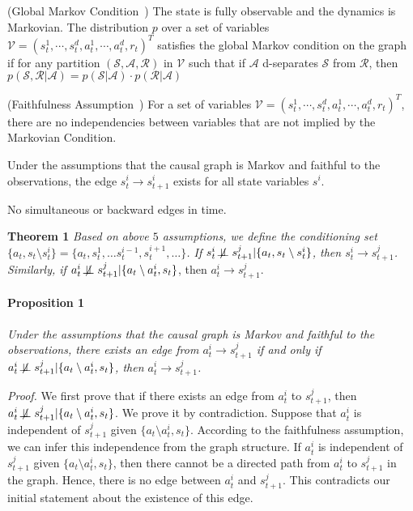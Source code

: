 \begin{assumption}
    (Global Markov Condition~\citep{spirtes2001causation, pearl2009causality}) The state is fully observable and the dynamics is Markovian. The distribution $p$ over a set of variables $\mathcal{V}=(s^1_{t},\cdots,s^d_{t},a^1_{t},\cdots,a^d_{t},r_t)^T$ satisfies the global Markov condition on the graph if for any partition $(\mathcal{S, A, R})$ in $\mathcal{V}$ such that if $\mathcal{A}$ d-separates $\mathcal{S}$ from $\mathcal{R}$, then $p(\mathcal{S},\mathcal{R}|\mathcal{A}) = p(\mathcal{S}|\mathcal{A})\cdot p(\mathcal{R}|\mathcal{A})$
\end{assumption}

\begin{assumption}
    (Faithfulness Assumption~\citep{spirtes2001causation, pearl2009causality}) 
For a set of variables $\mathcal{V}=(s^1_{t},\cdots,s^d_{t},a^1_{t},\cdots,a^d_{t},r_t)^T$, there are no independencies between variables that are not implied by the Markovian Condition.
\end{assumption}

\begin{assumption}
Under the assumptions that the causal graph is Markov and faithful to the observations, the edge $s^i_t \to  s^i_{t+1}$ exists for all state variables $s^i$.
\end{assumption}

\begin{assumption}
No simultaneous or backward edges in time.
\end{assumption}

\textbf{Theorem 1} \textit{Based on above $5$ assumptions, we define the conditioning set $\{ a_t, s_t  \setminus  s^i_t \} = \{ a_t,s^1_t, \dots s^{i-1}_t, s^{i+1}_t, \dots \}$. If $s^i_t \not \! \perp \!\!\! \perp s^j_{t+1} | \{ a_t, s_t  \setminus  s^i_t \}$, then $s^i_t \to s^j_{t+1}$. Similarly, if $a^i_t \not \! \perp \!\!\! \perp s^j_{t+1} | \{ a_t \setminus a^i_t, s_t \}$}, then $a^i_t \to s^j_{t+1}$.

\paragraph{Proposition 1}
\textit{Under the assumptions that the causal graph is Markov and faithful to the observations, there exists an edge from $a^i_t \to s^j_{t+1}$ if and only if $a^i_t \not \! \perp \!\!\! \perp s^j_{t+1} | \{ a_t \setminus a^i_t, s_t \}$, then $a^i_t \to s^j_{t+1}$.}

\textit{Proof.} We first prove that if there exists an edge from $a^i_t$ to $s^{j}_{t+1}$, then $a^i_t \not \! \perp \!\!\! \perp s^j_{t+1} | \{ a_t \setminus a^i_t, s_t \}$. We prove it by contradiction. Suppose that $a^i_t$ is independent of $s^{j}_{t+1}$ given $ \{ a_t \setminus a^i_t, s_t \}$. According to the faithfulness assumption, we can infer this independence from the graph structure. If $a^i_t$ is independent of $s^{j}_{t+1}$ given $ \{ a_t \setminus a^i_t, s_t \}$, then there cannot be a directed path from $a^i_t$ to $s^{j}_{t+1}$ in the graph. Hence, there is no edge between $a^i_t$ and $s^{j}_{t+1}$. This contradicts our initial statement about the existence of this edge. 


